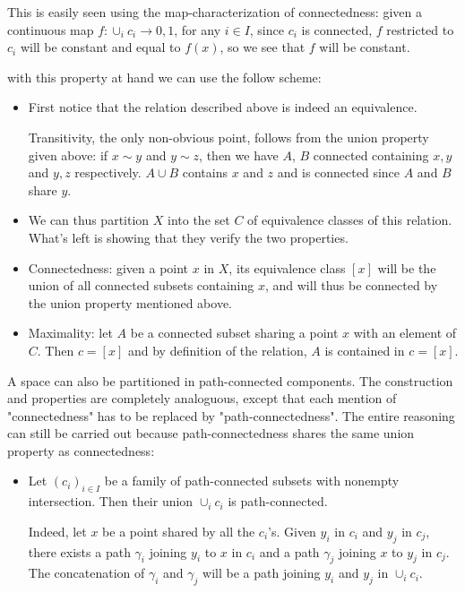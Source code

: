 \documentclass{report}
\theoremstyle{definition}
\begin{document}
\begin{itemize}
\begin{itemize}
        This is easily seen using the map-characterization of connectedness: given a continuous map $f:\cup_i c_i\rightarrow {0,1}$, for any $i\in I$, since $c_i$ is connected, $f$ restricted to $c_i$ will be constant and equal to $f(x)$, so we see that $f$ will be constant.
    \end{itemize}

    with this property at hand we can use the follow scheme:
    \begin{itemize}
        \item First notice that the relation described above is indeed an equivalence. 
        
        Transitivity, the only non-obvious point, follows from the union property given above: if $x\sim y$ and $y\sim z$, then we have $A$, $B$ connected containing $x,y$ and $y,z$ respectively. $A\cup B$ contains $x$ and $z$ and is connected since $A$ and $B$ share $y$.
        \item We can thus partition $X$ into the set $C$ of equivalence classes of this relation. What's left is showing that they verify the two properties.
        \item Connectedness: given a point $x$ in $X$, its equivalence class $[x]$ will be the union of all connected subsets containing $x$, and will thus be connected by the union property mentioned above.
        \item Maximality: let $A$ be a connected subset sharing a point $x$ with an element of $C$. Then $c=[x]$ and by definition of the relation, $A$ is contained in $c=[x]$.
    \end{itemize}
\end{itemize}

A space can also be partitioned in path-connected components. The construction and properties are completely analoguous, except that each mention of "connectedness" has to be replaced by "path-connectedness". The entire reasoning can still be carried out because path-connectedness shares the same union property as connectedness:
\begin{itemize}
    \item Let $(c_i)_{i\in I}$ be a family of path-connected subsets with nonempty intersection. Then their union $\cup_i c_i$ is path-connected.

    Indeed, let $x$ be a point shared by all the $c_i$'s. Given $y_i$ in $c_i$ and $y_j$ in $c_j$, there exists a path $\gamma_i$ joining $y_i$ to $x$ in $c_i$ and a path $\gamma_j$ joining $x$ to $y_j$ in $c_j$. The concatenation of $\gamma_i$ and $\gamma_j$ will be a path joining $y_i$ and $y_j$ in $\cup_i c_i$.
\end{itemize}
\end{document}
